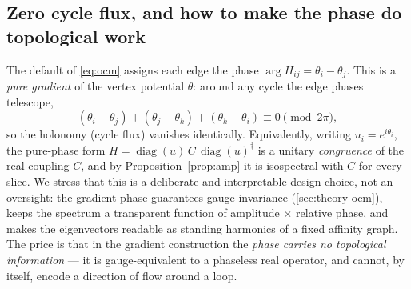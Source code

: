 \subsection{Zero cycle flux, and how to make the phase do topological work}
\label{sec:flux}

The default \OCM{} of \cref{eq:ocm} assigns each edge the phase
$\arg H_{ij} = \theta_i-\theta_j$. This is a \emph{pure gradient} of the vertex
potential $\theta$: around any cycle the edge phases telescope,
\begin{equation}
  (\theta_i-\theta_j)+(\theta_j-\theta_k)+(\theta_k-\theta_i)\equiv 0
  \pmod{2\pi},
  \label{eq:zeroflux}
\end{equation}
so the holonomy (cycle flux) vanishes identically. Equivalently, writing
$u_i=e^{i\theta_i}$, the pure-phase form
$H=\operatorname{diag}(u)\,C\,\operatorname{diag}(u)^{\dagger}$ is a unitary
\emph{congruence} of the real coupling $C$, and by
Proposition~\ref{prop:amp} it is isospectral with $C$ for every slice. We stress
that this is a deliberate and interpretable design choice, not an oversight: the
gradient phase guarantees gauge invariance (\cref{sec:theory-ocm}), keeps the
spectrum a transparent function of amplitude $\times$ relative phase, and makes
the eigenvectors readable as standing harmonics of a fixed affinity graph. The
price is that in the gradient construction the \emph{phase carries no
topological information} --- it is gauge-equivalent to a phaseless real operator,
and cannot, by itself, encode a direction of flow around a loop.

